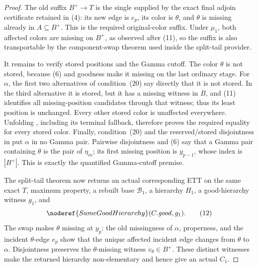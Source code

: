 \begin{proof}
The old suffix \(B^+\to T\) is the single
 supplied by the exact final adjoin
certificate retained in (4): its new edge is \(e_p\), its color is
\(\theta\), and \(\theta\) is missing already in \(A\subseteq B^+\).
This is the required original-color suffix.  Under \(\mu_1\), both
affected colors are missing on \(B^+\), as observed after (11), so the
suffix is also transportable by the component-swap theorem used inside
the split-tail provider.

It remains to verify stored positions and the Gamma cutoff.  The color
\(\theta\) is not stored, because (6) and goodness make it missing on
the last ordinary stage.  For \(\alpha\), the first two alternatives of
condition~(20) say directly that it is not stored.  In the third
alternative it is stored, but it has a missing witness in \(B\), and
(11) identifies all missing-position candidates through that witness;
thus its least position is unchanged.  Every other stored color is
unaffected everywhere.  Unfolding
, including its terminal fallback,
therefore proves the required equality for every stored color.  Finally,
condition~(20) and the reserved/stored disjointness in
 put \(\alpha\) in no Gamma pair.
Pairwise
disjointness and (6) say that a Gamma pair containing \(\theta\) is the
pair of \(\eta_m\); its first missing position is \(y_{p-1}\), whose
index is \(|B^+|\).  This is exactly the quantified Gamma-cutoff premise.

The split-tail theorem now returns an actual corresponding ETT on the
same exact \(T\), maximum property, a rebuilt base \(\mathcal B_1\), a
hierarchy \(H_1\), a good-hierarchy witness \(g_1\), and
\[
          \noderef{SameGoodHierarchy}(C.\mathit{good},g_1). \tag{12}
\]
The swap makes \(\theta\) missing at \(y_p\): the old missingness of
\(\alpha\), properness, and the incident \(\theta\)-edge \(e_p\) show
that the unique affected incident edge changes from \(\theta\) to
\(\alpha\).  Disjointness preserves the \(\theta\)-missing witness
\(v_\theta\in B^+\).  These distinct witnesses make the returned
hierarchy non-elementary and hence give an actual
 \(C_1\).


\end{proof}
